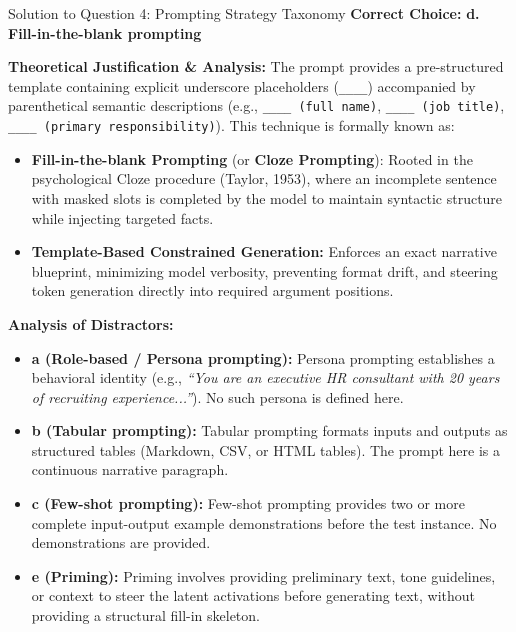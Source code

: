 \documentclass[11pt,a4paper]{article}
\begin{document}
\begin{solutionbox}{Solution to Question 4: Prompting Strategy Taxonomy}
\textbf{Correct Choice:} \textbf{d. Fill-in-the-blank prompting}

\medskip
\noindent
\textbf{Theoretical Justification \& Analysis:}
The prompt provides a pre-structured template containing explicit underscore placeholders (\texttt{\_\_\_\_}) accompanied by parenthetical semantic descriptions (e.g., \texttt{\_\_\_\_ (full name)}, \texttt{\_\_\_\_ (job title)}, \texttt{\_\_\_\_ (primary responsibility)}). This technique is formally known as:
\begin{itemize}[leftmargin=1.5em]
    \item \textbf{Fill-in-the-blank Prompting} (or \textbf{Cloze Prompting}): Rooted in the psychological Cloze procedure (Taylor, 1953), where an incomplete sentence with masked slots is completed by the model to maintain syntactic structure while injecting targeted facts.
    \item \textbf{Template-Based Constrained Generation:} Enforces an exact narrative blueprint, minimizing model verbosity, preventing format drift, and steering token generation directly into required argument positions.
\end{itemize}

\medskip
\noindent
\textbf{Analysis of Distractors:}
\begin{itemize}[leftmargin=1.5em]
    \item \textbf{a (Role-based / Persona prompting):} Persona prompting establishes a behavioral identity (e.g., \textit{``You are an executive HR consultant with 20 years of recruiting experience...''}). No such persona is defined here.
    \item \textbf{b (Tabular prompting):} Tabular prompting formats inputs and outputs as structured tables (Markdown, CSV, or HTML tables). The prompt here is a continuous narrative paragraph.
    \item \textbf{c (Few-shot prompting):} Few-shot prompting provides two or more complete input-output example demonstrations before the test instance. No demonstrations are provided.
    \item \textbf{e (Priming):} Priming involves providing preliminary text, tone guidelines, or context to steer the latent activations before generating text, without providing a structural fill-in skeleton.
\end{itemize}
\end{solutionbox}
\end{document}
